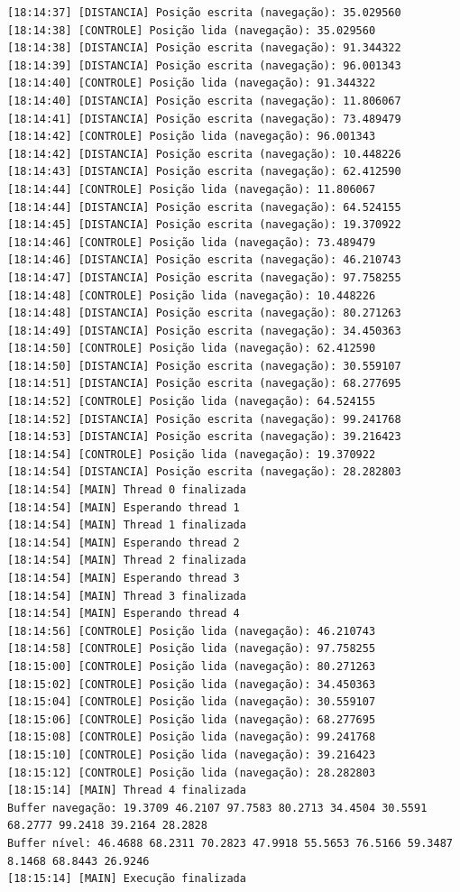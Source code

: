 \documentclass[12pt]{article}
\begin{document}
\begin{verbatim}
[18:14:37] [DISTANCIA] Posição escrita (navegação): 35.029560
[18:14:38] [CONTROLE] Posição lida (navegação): 35.029560
[18:14:38] [DISTANCIA] Posição escrita (navegação): 91.344322
[18:14:39] [DISTANCIA] Posição escrita (navegação): 96.001343
[18:14:40] [CONTROLE] Posição lida (navegação): 91.344322
[18:14:40] [DISTANCIA] Posição escrita (navegação): 11.806067
[18:14:41] [DISTANCIA] Posição escrita (navegação): 73.489479
[18:14:42] [CONTROLE] Posição lida (navegação): 96.001343
[18:14:42] [DISTANCIA] Posição escrita (navegação): 10.448226
[18:14:43] [DISTANCIA] Posição escrita (navegação): 62.412590
[18:14:44] [CONTROLE] Posição lida (navegação): 11.806067
[18:14:44] [DISTANCIA] Posição escrita (navegação): 64.524155
[18:14:45] [DISTANCIA] Posição escrita (navegação): 19.370922
[18:14:46] [CONTROLE] Posição lida (navegação): 73.489479
[18:14:46] [DISTANCIA] Posição escrita (navegação): 46.210743
[18:14:47] [DISTANCIA] Posição escrita (navegação): 97.758255
[18:14:48] [CONTROLE] Posição lida (navegação): 10.448226
[18:14:48] [DISTANCIA] Posição escrita (navegação): 80.271263
[18:14:49] [DISTANCIA] Posição escrita (navegação): 34.450363
[18:14:50] [CONTROLE] Posição lida (navegação): 62.412590
[18:14:50] [DISTANCIA] Posição escrita (navegação): 30.559107
[18:14:51] [DISTANCIA] Posição escrita (navegação): 68.277695
[18:14:52] [CONTROLE] Posição lida (navegação): 64.524155
[18:14:52] [DISTANCIA] Posição escrita (navegação): 99.241768
[18:14:53] [DISTANCIA] Posição escrita (navegação): 39.216423
[18:14:54] [CONTROLE] Posição lida (navegação): 19.370922
[18:14:54] [DISTANCIA] Posição escrita (navegação): 28.282803
[18:14:54] [MAIN] Thread 0 finalizada
[18:14:54] [MAIN] Esperando thread 1
[18:14:54] [MAIN] Thread 1 finalizada
[18:14:54] [MAIN] Esperando thread 2
[18:14:54] [MAIN] Thread 2 finalizada
[18:14:54] [MAIN] Esperando thread 3
[18:14:54] [MAIN] Thread 3 finalizada
[18:14:54] [MAIN] Esperando thread 4
[18:14:56] [CONTROLE] Posição lida (navegação): 46.210743
[18:14:58] [CONTROLE] Posição lida (navegação): 97.758255
[18:15:00] [CONTROLE] Posição lida (navegação): 80.271263
[18:15:02] [CONTROLE] Posição lida (navegação): 34.450363
[18:15:04] [CONTROLE] Posição lida (navegação): 30.559107
[18:15:06] [CONTROLE] Posição lida (navegação): 68.277695
[18:15:08] [CONTROLE] Posição lida (navegação): 99.241768
[18:15:10] [CONTROLE] Posição lida (navegação): 39.216423
[18:15:12] [CONTROLE] Posição lida (navegação): 28.282803
[18:15:14] [MAIN] Thread 4 finalizada
Buffer navegação: 19.3709 46.2107 97.7583 80.2713 34.4504 30.5591 68.2777 99.2418 39.2164 28.2828 
Buffer nível: 46.4688 68.2311 70.2823 47.9918 55.5653 76.5166 59.3487 8.1468 68.8443 26.9246 
[18:15:14] [MAIN] Execução finalizada
\end{verbatim}
\end{document}
